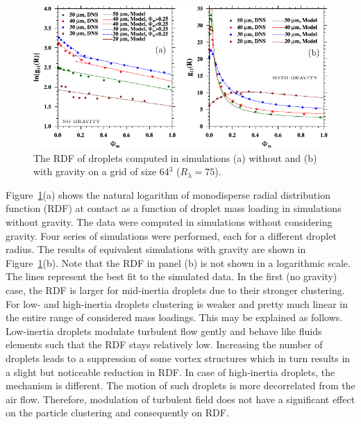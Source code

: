 \documentclass[../thesis.tex]{subfiles}
\begin{document}
\begin{figure}%
\center
\includegraphics[width=\textwidth]{./figs/IJMF/Figure2.pdf}
\caption{The RDF of droplets computed in simulations (a) without and (b) with gravity on a grid of size 64$^3$ ($R_{\lambda}=75$).}
\label{fig1}
\end{figure}%

Figure~\ref{fig1}(a) shows the natural logarithm of monodisperse radial distribution function (RDF) at contact as a function of droplet mass loading in simulations without gravity. The data were computed in simulations without considering gravity. Four series of simulations were performed, each for a different droplet radius. The results of equivalent simulations with gravity are shown in Figure~\ref{fig1}(b). Note that the RDF in panel (b) is not shown in a logarithmic scale. The lines represent the best fit to the simulated data. In the first (no gravity) case, the RDF is larger for mid-inertia droplets due to their stronger clustering. For low- and high-inertia droplets clustering is weaker and pretty much linear in the entire range of considered mass loadings. This may be explained as follows. Low-inertia droplets modulate turbulent flow gently and behave like fluids elements such that the RDF stays relatively low. Increasing the number of droplets leads to a suppression of some vortex structures \citep[see][]{RPW20} which in turn results in a slight but noticeable reduction in RDF. In case of high-inertia droplets, the mechanism is different. The motion of such droplets is more decorrelated from the air flow. Therefore, modulation of turbulent field does not have a significant effect on the particle clustering and consequently on RDF.
\end{document}
